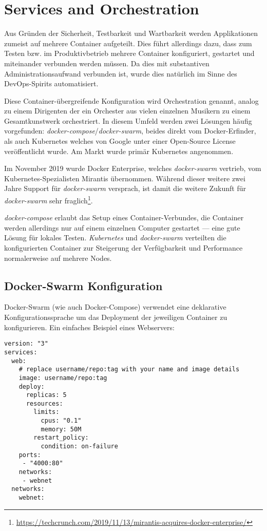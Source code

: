 \chapter{Services and Orchestration}

Aus Gründen der Sicherheit, Testbarkeit und Wartbarkeit werden Applikationen zumeist auf mehrere Container aufgeteilt. Dies führt allerdings dazu, dass zum Testen bzw. im Produktivbetrieb mehrere Container konfiguriert, gestartet und miteinander verbunden werden müssen. Da dies mit substantiven Administrationsaufwand verbunden ist, wurde dies natürlich im Sinne des DevOps-Spirits automatisiert.

Diese Container-übergreifende Konfiguration wird Orchestration genannt, analog zu einem Dirigenten der ein Orchester aus vielen einzelnen Musikern zu einem Gesamtkunstwerk orchestriert. In diesem Umfeld werden zwei Lösungen häufig vorgefunden: \textit{docker-compose}/\textit{docker-swarm}, beides direkt vom Docker-Erfinder, als auch Kubernetes welches von Google unter einer Open-Source License veröffentlicht wurde. Am Markt wurde primär Kubernetes angenommen.

Im November 2019 wurde Docker Enterprise, welches \textit{docker-swarm} vertrieb, vom Kubernetes-Spezialisten Mirantis übernommen. Während dieser weitere zwei Jahre Support für \textit{docker-swarm} versprach, ist damit die weitere Zukunft für \textit{docker-swarm} sehr fraglich\footnote{\url{https://techcrunch.com/2019/11/13/mirantis-acquires-docker-enterprise/}}.

\textit{docker-compose} erlaubt das Setup eines Container-Verbundes, die Container werden allerdings nur auf einem einzelnen Computer gestartet --- eine gute Lösung für lokales Testen. \textit{Kubernetes} und \textit{docker-swarm} verteilten die konfigurierten Container zur Steigerung der Verfügbarkeit und Performance normalerweise auf mehrere Nodes.

\section{Docker-Swarm Konfiguration}

Docker-Swarm (wie auch Docker-Compose) verwendet eine deklarative Konfigurationssprache um das Deployment der jeweiligen Container zu konfigurieren. Ein einfaches Beispiel eines Webservers:

\begin{verbatim}
version: "3"
services:
  web:
    # replace username/repo:tag with your name and image details
    image: username/repo:tag
    deploy:
      replicas: 5
      resources:
        limits:
          cpus: "0.1"
          memory: 50M
        restart_policy:
          condition: on-failure
    ports:
     - "4000:80"
    networks:
     - webnet
  networks:
    webnet:
\end{verbatim}


